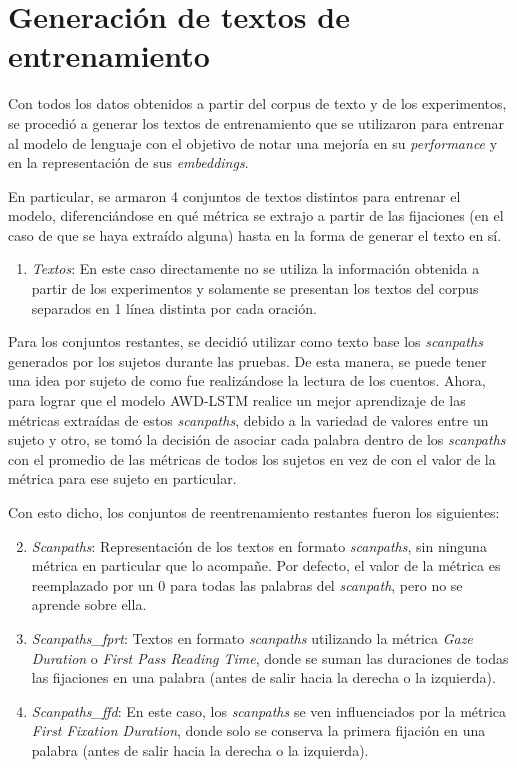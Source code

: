 \section{Generación de textos de entrenamiento}

Con todos los datos obtenidos a partir del corpus de texto y de los experimentos, se procedió a generar los textos de entrenamiento que se utilizaron para entrenar al modelo de lenguaje con el objetivo de notar una mejoría en su \textit{performance} y en la representación de sus \textit{embeddings}.

En particular, se armaron 4 conjuntos de textos distintos para entrenar el modelo, diferenciándose en qué métrica se extrajo a partir de las fijaciones (en el caso de que se haya extraído alguna) hasta en la forma de generar el texto en sí.

\begin{enumerate}
    \item \textit{Textos}: En este caso directamente no se utiliza la información obtenida a partir de los experimentos y solamente se presentan los textos del corpus separados en 1 línea distinta por cada oración.
\end{enumerate}

Para los conjuntos restantes, se decidió utilizar como texto base los \textit{scanpaths} generados por los sujetos durante las pruebas. De esta manera, se puede tener una idea por sujeto de como fue realizándose la lectura de los cuentos. Ahora, para lograr que el modelo AWD-LSTM realice un mejor aprendizaje de las métricas extraídas de estos \textit{scanpaths}, debido a la variedad de valores entre un sujeto y otro, se tomó la decisión de asociar cada palabra dentro de los \textit{scanpaths} con el promedio de las métricas de todos los sujetos en vez de con el valor de la métrica para ese sujeto en particular.

Con esto dicho, los conjuntos de reentrenamiento restantes fueron los siguientes:

\begin{enumerate}
    \setcounter{enumi}{1}
    \item \textit{Scanpaths}: Representación de los textos en formato \textit{scanpaths}, sin ninguna métrica en particular que lo acompañe. Por defecto, el valor de la métrica es reemplazado por un 0 para todas las palabras del \textit{scanpath}, pero no se aprende sobre ella.
    \item \textit{Scanpaths\_fprt}: Textos en formato \textit{scanpaths} utilizando la métrica \textit{Gaze Duration} o \textit{First Pass Reading Time}, donde se suman las duraciones de todas las fijaciones en una palabra (antes de salir hacia la derecha o la izquierda).
    \item \textit{Scanpaths\_ffd}: En este caso, los \textit{scanpaths} se ven influenciados por la métrica \textit{First Fixation Duration}, donde solo se conserva la primera fijación en una palabra (antes de salir hacia la derecha o la izquierda).
\end{enumerate}

